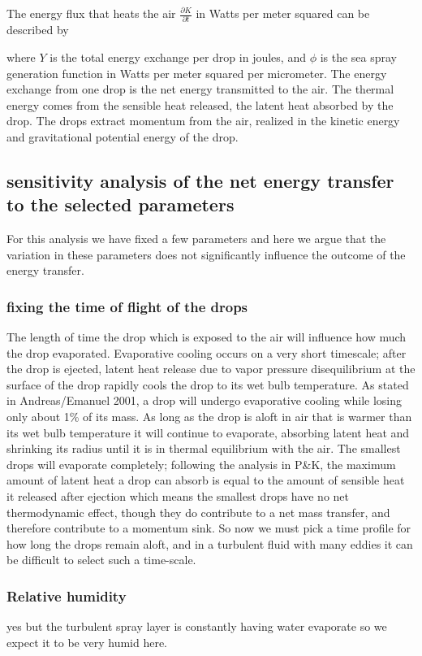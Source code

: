 \documentclass[10pt,a4paper]{article}
\begin{document}
The energy flux that heats the air $\frac{\partial K}{\partial t}$ in Watts per meter squared can be described by 

where $Y$ is the total energy exchange per drop in joules, and $\phi$ is the sea spray generation function in Watts per meter squared per micrometer. The energy exchange from one drop is the net energy transmitted to the air. The thermal energy comes from the sensible heat released, the latent heat absorbed by the drop. The drops extract momentum from the air, realized in the kinetic energy and gravitational potential energy of the drop. 

\subsection{sensitivity analysis of the net energy transfer to the selected parameters}
For this analysis we have fixed a few parameters and here we argue that the variation in these parameters does not significantly influence the outcome of the energy transfer. 
\subsubsection{fixing the time of flight of the drops}
The length of time the drop which is exposed to the air will influence how much the drop evaporated. Evaporative cooling occurs on a very short timescale; after the drop is ejected, latent heat release due to vapor pressure disequilibrium at the surface of the drop rapidly cools the drop to its wet bulb temperature. As stated in Andreas/Emanuel 2001, a drop will undergo evaporative cooling while losing only about 1\% of its mass. As long as the drop is aloft in air that is warmer than its wet bulb temperature it will continue to evaporate, absorbing latent heat and shrinking its radius until it is in thermal equilibrium with the air. The smallest drops will evaporate completely; following the analysis in P\&K, the maximum amount of latent heat a drop can absorb is equal to the amount of sensible heat it released after ejection which means the smallest drops have no net thermodynamic effect, though they do contribute to a net mass transfer, and therefore contribute to a momentum sink. So now we must pick a time profile for how long the drops remain aloft, and in a turbulent fluid with many eddies it can be difficult to select such a time-scale. 

\subsubsection{Relative humidity}
yes but the turbulent spray layer is constantly having water evaporate so we expect it to be very humid here.
\end{document}
